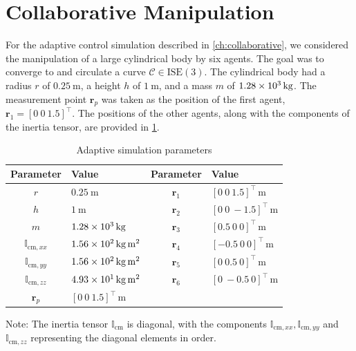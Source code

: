 \section{Collaborative Manipulation}
For the adaptive control simulation described in \cref{ch:collaborative}, we considered the manipulation of a large cylindrical body by six agents. The goal was to converge to and circulate a curve $\mathcal{C}\in\text{ISE}(3)$. The cylindrical body had a radius $r$ of $\qty{0.25}{\meter}$, a height $h$ of $\qty{1}{\meter}$, and a mass $m$ of $\qty{1.28E3}{\kilogram}$. The measurement point $\mathbf{r}_p$ was taken as the position of the first agent, $\mathbf{r}_1=[0\ 0\ 1.5]^\top$. The positions of the other agents, along with the components of the inertia tensor, are provided in \cref{tb:parameters}.
\begin{table}[htb]
    \centering
    \begin{threeparttable}
    \caption{Adaptive simulation parameters}\label{tb:parameters}
    \begin{tabular}{clcl}
    Parameter & Value & Parameter & Value\\\hline
    $r$ & $\qty{0.25}{\meter}$ & $\mathbf{r}_{1}$ & $[0\ 0\ 1.5]^\top\,\unit{\meter}$\\
    $h$ & $\qty{1}{\meter}$ & $\mathbf{r}_{2}$ & $[0\ 0\ -1.5]^\top\,\unit{\meter}$\\
    $m$ & $\qty{1.28E3}{\kilogram}$ & 
    $\mathbf{r}_{3}$ & $[0.5\ 0\ 0]^\top\,\unit{\meter}$\\
    $\mathbb{I}_{\text{cm}, xx}$ & $\qty{1.56E2}{\kilogram\meter\squared}$ & 
    $\mathbf{r}_{4}$ & $[-0.5\ 0\ 0]^\top\,\unit{\meter}$\\  
    $\mathbb{I}_{\text{cm}, yy}$ & $\qty{1.56E2}{\kilogram\meter\squared}$ &
    $\mathbf{r}_{5}$ & $[0\ 0.5\ 0]^\top\,\unit{\meter}$\\
    $\mathbb{I}_{\text{cm}, zz}$ & $\qty{4.93E1}{\kilogram\meter\squared}$  & 
    $\mathbf{r}_{6}$ & $[0\ -0.5 \ 0]^\top\,\unit{\meter}$\\
    $\mathbf{r}_{p}$ & $[0\ 0\ 1.5]^\top\,\unit{\meter}$ \\\hline
    \end{tabular}
    \begin{tablenotes}
        \footnotesize
        \item Note: The inertia tensor $\mathbb{I}_\text{cm}$ is diagonal, with the components $\mathbb{I}_{\text{cm}, xx}, \mathbb{I}_{\text{cm}, yy}$ and $\mathbb{I}_{\text{cm}, zz}$ representing the diagonal elements in order.
    \end{tablenotes}
    \end{threeparttable}
\end{table}

